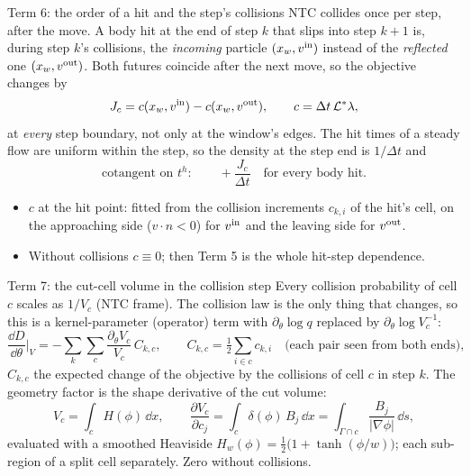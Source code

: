 \begin{frame}{Term 6: the order of a hit and the step's collisions}
NTC collides once per step, after the move.  A body hit at the end of step $k$ that slips into
step $k+1$ is, during step $k$'s collisions, the \emph{incoming} particle $(x_w, v^{\mathrm{in}})$
instead of the \emph{reflected} one $(x_w, v^{\mathrm{out}})$.  Both futures coincide after the next
move, so the objective changes by
\[
J_{c} = c(x_w, v^{\mathrm{in}}) - c(x_w, v^{\mathrm{out}}),\qquad c = \Delta t\,\mathcal L^*\lambda ,
\]
at \emph{every} step boundary, not only at the window's edges.  The hit times of a steady flow
are uniform within the step, so the density at the step end is $1/\Delta t$ and
\[
\text{cotangent on } t^h:\qquad +\frac{J_c}{\Delta t}\quad\text{for every body hit.}
\]
\begin{itemize}
\item $c$ at the hit point: fitted from the collision increments $c_{k,i}$ of the hit's
  cell, on the approaching side ($v\cdot n<0$) for $v^{\mathrm{in}}$ and the leaving side for $v^{\mathrm{out}}$.
\item Without collisions $c\equiv0$; then Term 5 is the whole hit-step dependence.
\end{itemize}
\end{frame}

\begin{frame}{Term 7: the cut-cell volume in the collision step}
Every collision probability of cell $c$ scales as $1/V_c$ (NTC frame).  The collision law is
the only thing that changes, so this is a kernel-parameter (operator) term with
$\partial_\theta\log q$ replaced by $\partial_\theta\log V_c^{-1}$:
\[
\frac{\dd D}{\dd\theta}\Big|_V = -\sum_k\sum_c\frac{\partial_\theta V_c}{V_c}\,C_{k,c},
\qquad
C_{k,c} = \tfrac12\sum_{i\in c} c_{k,i}\quad\text{(each pair seen from both ends)},
\]
$C_{k,c}$ the expected change of the objective by the collisions of cell $c$ in step $k$.
The geometry factor is the shape derivative of the cut volume:
\[
V_c = \int_c H(\phi)\,\dd x,\qquad
\frac{\partial V_c}{\partial c_j} = \int_c\delta(\phi)\,B_j\,\dd x
= \int_{\Gamma\cap c}\frac{B_j}{|\nabla\phi|}\,\dd s ,
\]
evaluated with a smoothed Heaviside $H_w(\phi) = \tfrac12\big(1 + \tanh(\phi/w)\big)$; each
sub-region of a split cell separately.  Zero without collisions.
\end{frame}

